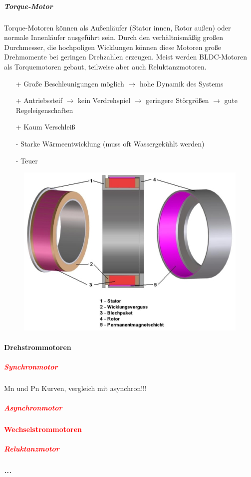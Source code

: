 					\subparagraph{Torque-Motor} 
						Torque-Motoren können als Außenläufer (Stator innen, Rotor außen) oder normale Innenläufer ausgeführt sein. Durch den verhältnismäßig großen Durchmesser, die hochpoligen Wicklungen können diese Motoren große Drehmomente bei geringen Drehzahlen erzeugen. Meist werden BLDC-Motoren als Torquemotoren gebaut, teilweise aber auch Reluktanzmotoren.
						\begin{itemize}
							\item[+] Große Beschleunigungen möglich $ \rightarrow $ hohe Dynamik des Systems
							\item[+] Antriebssteif $ \rightarrow $ kein Verdrehspiel $ \rightarrow $ geringere Störgrößen $ \rightarrow $ gute Regeleigenschaften
							\item[+] Kaum Verschleiß
							\item[-] Starke Wärmeentwicklung (muss oft Wassergekühlt werden)
							\item[-] Teuer
						\end{itemize}
						\begin{figure}[h]
							\centering
							\includegraphics[width=0.5\linewidth]{./pics/el/TM}
						\end{figure}
						
				\paragraph{Drehstrommotoren} 
					\subparagraph{\textcolor{red}{Synchronmotor}}						
						Mn und Pn Kurven, vergleich mit asynchron!!!
					\subparagraph{\textcolor{red}{Asynchronmotor}}
				\paragraph{\textcolor{red}{Wechselstrommotoren}} 
					\subparagraph{\textcolor{red}{Reluktanzmotor}}
					\subparagraph{...}